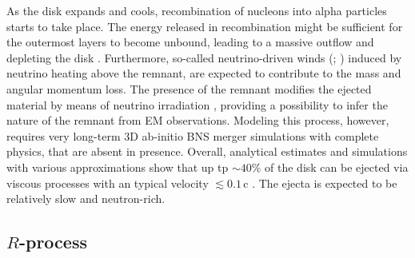As the disk expands and cools, recombination of nucleons into alpha particles 
starts to take place. The energy released in recombination might be sufficient 
for the outermost layers to become unbound, leading to a massive outflow and 
depleting the disk \citep{Beloborodov:2008nx,Lee:2009uc,Fernandez:2013tya}.
%
%
Furthermore, so-called neutrino-driven winds (\nwind{}; \citet{Dessart:2008zd,Perego:2014fma,Just:2014fka})
induced by neutrino heating above the remnant, 
are expected to contribute to the mass and angular momentum loss. 
%
The presence of the remnant modifies the ejected material by means of 
neutrino irradiation \citep{Fernandez:2015use}, providing a possibility to infer the nature of 
the remnant from \ac{EM} observations. Modeling this process, however, requires very long-term 
$3$D ab-initio \ac{BNS} merger simulations with complete physics, that are absent in presence.
%
Overall, analytical estimates and simulations with various approximations show that 
up tp ${\sim}40\%$ of the disk can be ejected via viscous processes with an 
typical velocity ${\lesssim}0.1\,$c \citep{Fernandez:2018kax,Radice:2018xqa}.
The ejecta is expected to be relatively slow and neutron-rich. 



\subsection{$R$-process \nuc{}} \label{sec:intro:nucleo}

